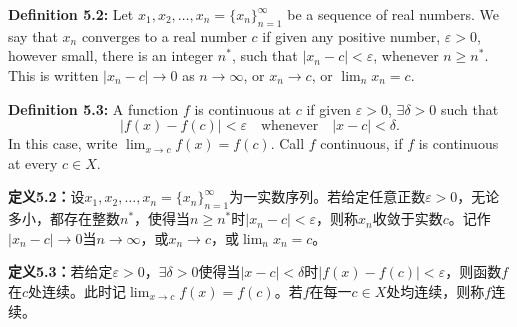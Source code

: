 \begin{original}
\textbf{Definition 5.2:} Let $x_1, x_2, \ldots, x_n = \{x_n\}_{n=1}^{\infty}$ be a sequence of real numbers. We say that $x_n$ converges to a real number $c$ if given any positive number, $\varepsilon > 0$, however small, there is an integer $n^*$, such that $|x_n - c| < \varepsilon$, whenever $n \ge n^*$. This is written $|x_n - c| \to 0$ as $n \to \infty$, or $x_n \to c$, or $\lim_n x_n = c$.

\textbf{Definition 5.3:} A function $f$ is continuous at $c$ if given $\varepsilon > 0$, $\exists \delta > 0$ such that
\[
|f(x) - f(c)| < \varepsilon \quad \text{whenever} \quad |x - c| < \delta.
\]
In this case, write $\lim_{x \to c} f(x) = f(c)$. Call $f$ continuous, if $f$ is continuous at every $c \in X$.
\end{original}
\begin{translation}
\textbf{定义5.2：}设$x_1, x_2, \ldots, x_n = \{x_n\}_{n=1}^{\infty}$为一实数序列。若给定任意正数$\varepsilon > 0$，无论多小，都存在整数$n^*$，使得当$n \ge n^*$时$|x_n - c| < \varepsilon$，则称$x_n$收敛于实数$c$。记作$|x_n - c| \to 0$当$n \to \infty$，或$x_n \to c$，或$\lim_n x_n = c$。

\textbf{定义5.3：}若给定$\varepsilon > 0$，$\exists \delta > 0$使得当$|x - c| < \delta$时$|f(x) - f(c)| < \varepsilon$，则函数$f$在$c$处连续。此时记$\lim_{x \to c} f(x) = f(c)$。若$f$在每一$c \in X$处均连续，则称$f$连续。
\end{translation}

